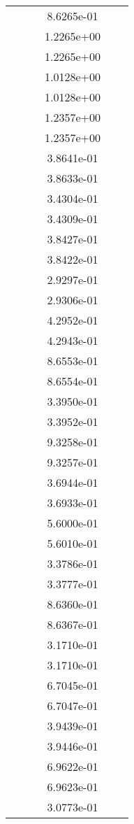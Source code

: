 \begin{xltabular}{\textwidth}{r|rS[table-format=1.3e+2]S[table-format=1.4e+2]S[table-format=1.4e+2]S[table-format=-1.5]}
&  &  & 8.6265e-01 & & \\
&  &  & 1.2265e+00 & & \\
&  &  & 1.2265e+00 & & \\
&  &  & 1.0128e+00 & & \\
&  &  & 1.0128e+00 & & \\
&  &  & 1.2357e+00 & & \\
&  &  & 1.2357e+00 & & \\
&  &  & 3.8641e-01 & & \\
&  &  & 3.8633e-01 & & \\
&  &  & 3.4304e-01 & & \\
&  &  & 3.4309e-01 & & \\
&  &  & 3.8427e-01 & & \\
&  &  & 3.8422e-01 & & \\
&  &  & 2.9297e-01 & & \\
&  &  & 2.9306e-01 & & \\
&  &  & 4.2952e-01 & & \\
&  &  & 4.2943e-01 & & \\
&  &  & 8.6553e-01 & & \\
&  &  & 8.6554e-01 & & \\
&  &  & 3.3950e-01 & & \\
&  &  & 3.3952e-01 & & \\
&  &  & 9.3258e-01 & & \\
&  &  & 9.3257e-01 & & \\
&  &  & 3.6944e-01 & & \\
&  &  & 3.6933e-01 & & \\
&  &  & 5.6000e-01 & & \\
&  &  & 5.6010e-01 & & \\
&  &  & 3.3786e-01 & & \\
&  &  & 3.3777e-01 & & \\
&  &  & 8.6360e-01 & & \\
&  &  & 8.6367e-01 & & \\
&  &  & 3.1710e-01 & & \\
&  &  & 3.1710e-01 & & \\
&  &  & 6.7045e-01 & & \\
&  &  & 6.7047e-01 & & \\
&  &  & 3.9439e-01 & & \\
&  &  & 3.9446e-01 & & \\
&  &  & 6.9622e-01 & & \\
&  &  & 6.9623e-01 & & \\
&  &  & 3.0773e-01 & & \\

\end{xltabular}
